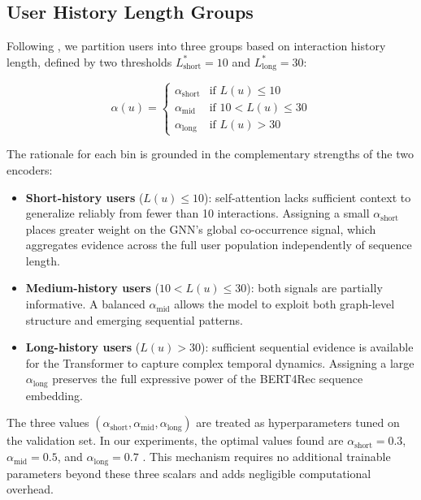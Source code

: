 \documentclass[12pt,a4paper]{report}
\newcommand{\textcite}[1]{\citet{#1}}
\newcommand{\parencite}[1]{\citep{#1}}
\begin{document}
\subsection{User History Length Groups}

Following \textcite{ouledmeriem2025hybrid}, we partition users
into three groups based on interaction history length, defined
by two thresholds $L^*_{\text{short}} = 10$ and
$L^*_{\text{long}} = 30$:

\begin{equation}
  \alpha(u) =
  \begin{cases}
    \alpha_{\text{short}} & \text{if } L(u) \leq 10 \\
    \alpha_{\text{mid}}   & \text{if } 10 < L(u) \leq 30 \\
    \alpha_{\text{long}}  & \text{if } L(u) > 30
  \end{cases}
\end{equation}

The rationale for each bin is grounded in the complementary
strengths of the two encoders:

\begin{itemize}
  \item \textbf{Short-history users} ($L(u) \leq 10$): self-attention
        lacks sufficient context to generalize reliably from fewer
        than 10 interactions. Assigning a small $\alpha_{\text{short}}$
        places greater weight on the GNN's global co-occurrence signal,
        which aggregates evidence across the full user population
        independently of sequence length.

  \item \textbf{Medium-history users} ($10 < L(u) \leq 30$): both
        signals are partially informative. A balanced
        $\alpha_{\text{mid}}$ allows the model to exploit both
        graph-level structure and emerging sequential patterns.

  \item \textbf{Long-history users} ($L(u) > 30$): sufficient
        sequential evidence is available for the Transformer to
        capture complex temporal dynamics. Assigning a large
        $\alpha_{\text{long}}$ preserves the full expressive power
        of the BERT4Rec sequence embedding.
\end{itemize}

The three values $(\alpha_{\text{short}}, \alpha_{\text{mid}},
\alpha_{\text{long}})$ are treated as hyperparameters tuned on
the validation set. In our experiments, the optimal values found
are $\alpha_{\text{short}} = 0.3$, $\alpha_{\text{mid}} = 0.5$,
and $\alpha_{\text{long}} = 0.7$ \parencite{ouledmeriem2025hybrid}.
This mechanism requires no additional trainable parameters beyond
these three scalars and adds negligible computational overhead.
\end{document}
